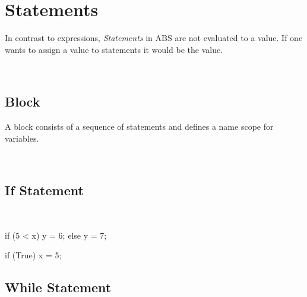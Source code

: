 \chapter{Statements}
In contrast to expressions, \emph{Statements} in ABS are not
evaluated to a value. If one wants to assign a value to statements
it would be the  value.

\begin{abssyntax}
     {}
                 {}
                 {}
                 {}
                 {}
                 {}
                 {}
                 {}
                 {}\\
  {}
                 {}
                 {}
\end{abssyntax}

\section{Block}
A block consists of a sequence of statements and defines a name scope for variables.



\begin{abssyntax}
  \TRS{\{}\ \ \TRS{\}}
\end{abssyntax}

\section{If Statement}

\begin{abssyntax}
  {}\ \TRS{(}  \TRS{)}\  
\end{abssyntax}

\begin{absexample}
if (5 < x) {
  y = 6;
} else {
  y = 7;
}

if (True)
  x = 5;
\end{absexample}

\section{While Statement}

